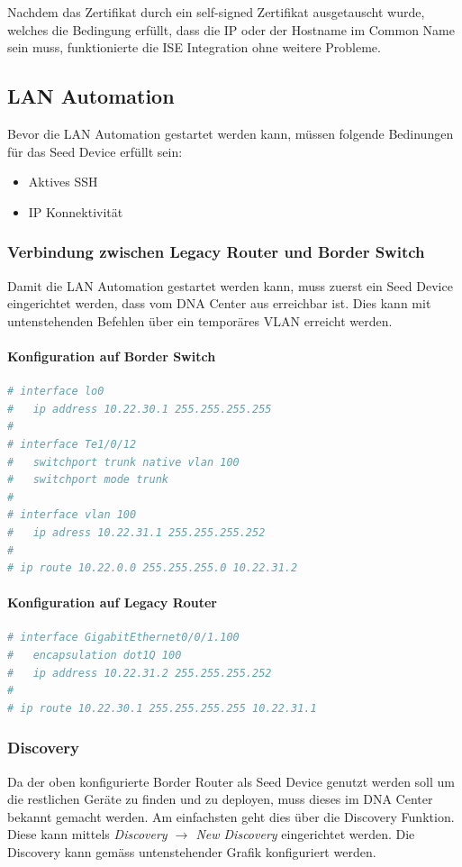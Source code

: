 Nachdem das Zertifikat durch ein self-signed Zertifikat ausgetauscht wurde, welches die Bedingung erfüllt, dass die IP oder der Hostname im Common Name sein muss, funktionierte die ISE Integration ohne weitere Probleme.

\subsection{LAN Automation}

Bevor die LAN Automation gestartet werden kann, müssen folgende Bedinungen für das Seed Device erfüllt sein:
\begin{itemize}
	\item Aktives SSH
	\item IP Konnektivität
\end{itemize}

\subsubsection{Verbindung zwischen Legacy Router und Border Switch}
Damit die LAN Automation gestartet werden kann, muss zuerst ein Seed Device eingerichtet werden, dass vom DNA Center aus erreichbar ist. Dies kann mit untenstehenden Befehlen über ein temporäres VLAN erreicht werden. 

\paragraph{Konfiguration auf Border Switch}
\begin{lstlisting}[language=bash]
# interface lo0
#   ip address 10.22.30.1 255.255.255.255
#
# interface Te1/0/12
#   switchport trunk native vlan 100
#   switchport mode trunk
#
# interface vlan 100
#   ip adress 10.22.31.1 255.255.255.252
# 
# ip route 10.22.0.0 255.255.255.0 10.22.31.2
\end{lstlisting}

\paragraph{Konfiguration auf Legacy Router}
\begin{lstlisting}[language=bash]
# interface GigabitEthernet0/0/1.100
#   encapsulation dot1Q 100
#   ip address 10.22.31.2 255.255.255.252
#
# ip route 10.22.30.1 255.255.255.255 10.22.31.1
\end{lstlisting}

\subsubsection{Discovery}
Da der oben konfigurierte Border Router als Seed Device genutzt werden soll um die restlichen Geräte zu finden und zu deployen, muss dieses im DNA Center bekannt gemacht werden. Am einfachsten geht dies über die Discovery Funktion. Diese kann mittels \textit{Discovery $\rightarrow$ New Discovery} eingerichtet werden. Die Discovery kann gemäss untenstehender Grafik konfiguriert werden.

